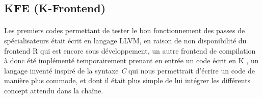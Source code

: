 \subsection{KFE (K-Frontend)}
\paragraph{}
Les premiers codes permettant de tester le bon fonctionnement des passes de
spécialisateurs était écrit en langage LLVM, en raison de non disponibilité du
frontend R qui est encore sous développement, un autre frontend de compilation à
donc été implémenté temporairement prenant en entrée un code écrit en \og{} K
\fg{}, un langage inventé inspiré de la syntaxe \emph{C} qui nous permettrait
d'écrire un code de manière plus commode, et dont il était plus simple de lui
intégrer les différents concept attendu dans la chaîne.
